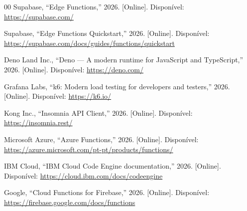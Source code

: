 \documentclass[conference]{IEEEtran}
\begin{document}
\begin{thebibliography}{00}
 Supabase, ``Edge Functions,'' 2026. [Online]. Disponível: \url{https://supabase.com/}

 Supabase, ``Edge Functions Quickstart,'' 2026. [Online]. Disponível: \url{https://supabase.com/docs/guides/functions/quickstart}

 Deno Land Inc., ``Deno --- A modern runtime for JavaScript and TypeScript,'' 2026. [Online]. Disponível: \url{https://deno.com/}

 Grafana Labs, ``k6: Modern load testing for developers and testers,'' 2026. [Online]. Disponível: \url{https://k6.io/}

 Kong Inc., ``Insomnia API Client,'' 2026. [Online]. Disponível: \url{https://insomnia.rest/}

 Microsoft Azure, ``Azure Functions,'' 2026. [Online]. Disponível: \url{https://azure.microsoft.com/pt-pt/products/functions/}

 IBM Cloud, ``IBM Cloud Code Engine documentation,'' 2026. [Online]. Disponível: \url{https://cloud.ibm.com/docs/codeengine}

 Google, ``Cloud Functions for Firebase,'' 2026. [Online]. Disponível: \url{https://firebase.google.com/docs/functions}

\end{thebibliography}
\end{document}
